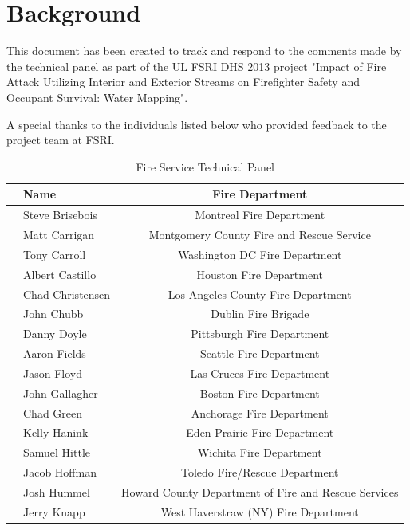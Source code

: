 \documentclass[12pt,oneside]{book}
\begin{document}
\mainmatter

\chapter*{Background}
\label{background}

This document has been created to track and respond to the comments made by the technical panel as part of the UL FSRI DHS 2013 project "Impact of Fire Attack Utilizing Interior and Exterior Streams on Firefighter Safety and Occupant Survival: Water Mapping". 

A special thanks to the individuals listed below who provided feedback to the project team at FSRI. 

\begin{table}[!ht]
	\centering
	\caption*{Fire Service Technical Panel}
	\begin{tabular}{llc}
		\toprule[1.5pt]
		& Name & Fire Department \\ 
		\hline
		& Steve Brisebois  & Montreal Fire Department \\ 
		& Matt Carrigan    & Montgomery County Fire and Rescue Service \\ 
		& Tony Carroll     & Washington DC Fire Department \\ 
		& Albert Castillo  & Houston Fire Department \\ 
		\checkmark & Chad Christensen & Los Angeles County Fire Department \\ 
		& John Chubb       & Dublin Fire Brigade \\ 		 		  
		& Danny Doyle      & Pittsburgh Fire Department \\ 
		& Aaron Fields     & Seattle Fire Department \\ 
		\checkmark & Jason Floyd      & Las Cruces Fire Department \\ 
		& John Gallagher   & Boston Fire Department \\ 
		& Chad Green       & Anchorage Fire Department \\ 
		\checkmark & Kelly Hanink     & Eden Prairie Fire Department \\ 
		& Samuel Hittle    & Wichita Fire Department \\ 
		\checkmark & Jacob Hoffman    & Toledo Fire/Rescue Department \\ 
		\checkmark & Josh Hummel      & Howard County Department of Fire and Rescue Services \\ 
		\checkmark & Jerry Knapp      & West Haverstraw (NY) Fire Department \\ 

\end{tabular}
\end{table}
\end{document}

